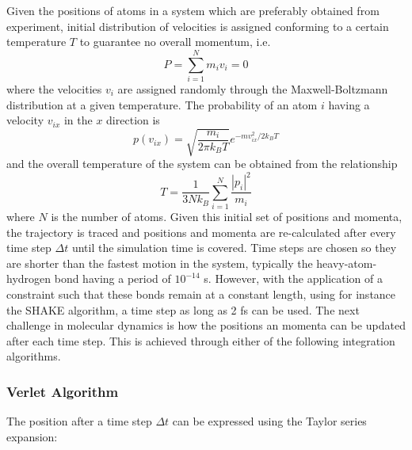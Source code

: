 \documentclass[11pt]{report}
\begin{document}
Given the positions of atoms in a system which 
are preferably obtained from experiment, initial distribution
of velocities is assigned conforming to a certain temperature
$T$ to guarantee no overall momentum, i.e.
\begin{equation}
P = \sum_{i=1}^{N} m_i v_i = 0
\end{equation}
where the velocities $v_i$ are assigned randomly through
the Maxwell-Boltzmann distribution at a given temperature.
The probability of an atom $i$ having a velocity $v_{ix}$
in the $x$ direction is
\begin{equation}
p(v_{ix}) = \sqrt{\frac{m_i}{2 \pi k_B T}}
e^{-mv_{ix}^2/2k_BT}
\end{equation}
and the overall temperature of the system can be obtained
from the relationship
\begin{equation}
T = \frac{1}{3Nk_B} \sum_{i=1}^{N} \frac{|p_i|^2}{m_i}
\end{equation}
where $N$ is the number of atoms. Given this initial set of
positions and momenta, the trajectory is traced 
and positions and momenta are re-calculated
after every time step $\Delta t$ until the simulation time
is covered. Time steps are chosen so they are shorter than 
the fastest motion in the system, typically the
heavy-atom-hydrogen bond having a period of $10^{-14}$ s. However, with the application of a constraint
such that these bonds remain at a constant length,
using for instance the SHAKE algorithm, a time step as 
long as 2 fs can be used. The next challenge in molecular
dynamics is how the positions an momenta can be updated
after each time step. This is achieved through either of
the following integration algorithms.

\subsubsection{Verlet Algorithm}

The position after a time step $\Delta t$ can be expressed
using the Taylor series expansion:
\end{document}
